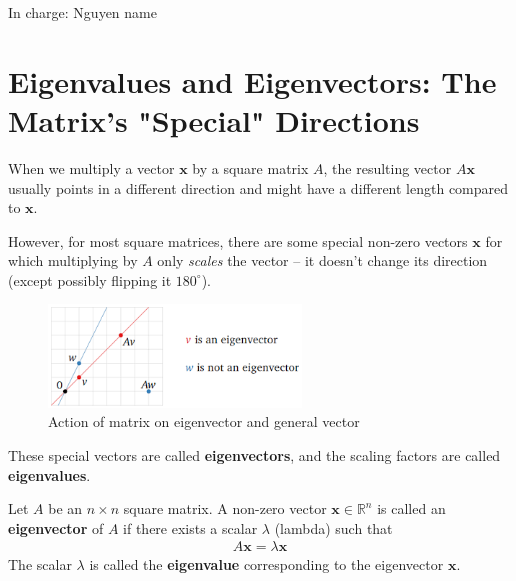 \documentclass[11pt]{article}
\newcommand{\R}{\mathbb{R}}
\newcommand{\x}{\mathbf{x}}
\begin{document}




In charge: Nguyen name

\section{Eigenvalues and Eigenvectors: The Matrix's "Special" Directions}

When we multiply a vector $\x$ by a square matrix $A$, the resulting vector $A\x$ usually points in a different direction and might have a different length compared to $\x$.


However, for most square matrices, there are some special non-zero vectors $\x$ for which multiplying by $A$ only \textit{scales} the vector – it doesn't change its direction (except possibly flipping it $180^\circ$).

\begin{figure}[h]
\begin{center}
\includegraphics[width=0.6\textwidth]{LA Lecture notes/figures/lec3_eigenvector.png}
\end{center}
\caption{Action of matrix on eigenvector and general vector}
\end{figure}

These special vectors are called \textbf{eigenvectors}, and the scaling factors are called \textbf{eigenvalues}.

\begin{definition}
Let $A$ be an $n \times n$ square matrix. A non-zero vector $\x \in \R^n$ is called an \textbf{eigenvector} of $A$ if there exists a scalar $\lambda$ (lambda) such that
\begin{align} \label{eq:eigen_def}
    A\x = \lambda \x
\end{align}
The scalar $\lambda$ is called the \textbf{eigenvalue} corresponding to the eigenvector $\x$.
\end{definition}
\end{document}
